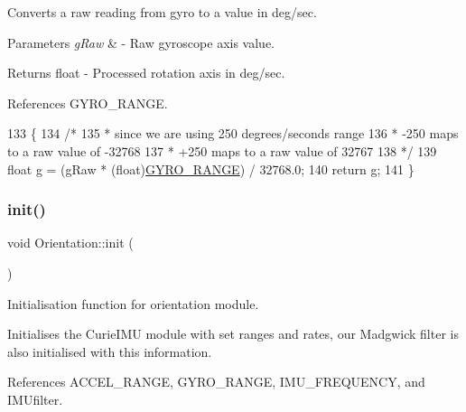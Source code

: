 Converts a raw reading from gyro to a value in deg/sec. 


\begin{DoxyParams}{Parameters}
{\em g\+Raw} & -\/ Raw gyroscope axis value. \\
\hline
\end{DoxyParams}
\begin{DoxyReturn}{Returns}
float -\/ Processed rotation axis in deg/sec. 
\end{DoxyReturn}


References G\+Y\+R\+O\+\_\+\+R\+A\+N\+GE.


\begin{DoxyCode}
133 \{
134   \textcolor{comment}{/*}
135 \textcolor{comment}{   * since we are using 250 degrees/seconds range}
136 \textcolor{comment}{   * -250 maps to a raw value of -32768}
137 \textcolor{comment}{   * +250 maps to a raw value of 32767}
138 \textcolor{comment}{   */}
139   \textcolor{keywordtype}{float} g = (gRaw * (float)\hyperlink{_orientation_8cpp_af9a0775d43604d7410e3da3dbc90925a}{GYRO\_RANGE}) / 32768.0;
140   \textcolor{keywordflow}{return} g;
141 \}
\end{DoxyCode}
\mbox{\label{class_orientation_a317461c5c8afa8c3abf56847d4544728}} 
\subsubsection{\texorpdfstring{init()}{init()}}
{\footnotesize\ttfamily void Orientation\+::init (\begin{DoxyParamCaption}{ }\end{DoxyParamCaption})}



Initialisation function for orientation module. 

Initialises the Curie\+I\+MU module with set ranges and rates, our Madgwick filter is also initialised with this information. 

References A\+C\+C\+E\+L\+\_\+\+R\+A\+N\+GE, G\+Y\+R\+O\+\_\+\+R\+A\+N\+GE, I\+M\+U\+\_\+\+F\+R\+E\+Q\+U\+E\+N\+CY, and I\+M\+Ufilter.



